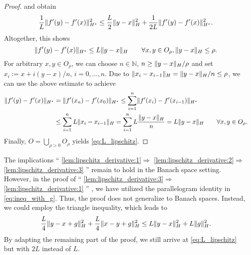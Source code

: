 \documentclass[
	english
]{scrartcl}
\numberwithin{equation}{section} %
\DeclarePairedDelimiter\norm{\lVert}{\rVert}
\newcommand\N{\mathbb{N}}
\newcommand{\dualspace}{^\star}
\begin{document}
\begin{proof}
	and obtain
	\begin{equation*}
		\frac 1 L \norm{f'(y) - f'(x)}^2_{H\dualspace}
		\le
		\frac L2 \norm{y - x}_H^2 + \frac 1 {2 L} \norm{f'(y) - f'(x)}_{H\dualspace}^2
		.
	\end{equation*}
	Altogether,
	this shows
	\begin{equation*}
		\norm{f'(y) - f'(x)}_{H\dualspace}
		\le
		L \norm{y - x}_H
		\qquad
		\forall x,y \in O_\rho, \norm{y - x}_H \le \rho
		.
	\end{equation*}
	For arbitrary $x,y \in O_\rho$,
	we can choose $n \in \N$, $n \ge \norm{y - x}_H / \rho$
	and set
	$x_i := x + i (y - x) / n$, $i = 0,\ldots, n$.
	Due to $\norm{x_i - x_{i-1}}_H = \norm{y - x}_H / n \le \rho$,
	we can use the above estimate to achieve
	\begin{align*}
		\norm{f'(y) - f'(x)}_{H\dualspace}
		&=
		\norm{f'(x_n) - f'(x_0)}_{H\dualspace}
		\le
		\sum_{i = 1}^n \norm{f'(x_i) - f'(x_{i-1})}_{H\dualspace}
		\\
		&\le
		\sum_{i = 1}^n L \norm{x_i - x_{i-1}}_H
		=
		\sum_{i = 1}^n L \frac{\norm{y - x}_H}{n}
		= L \norm{y - x}_H
		\qquad\forall x,y \in O_\rho
		.
	\end{align*}
	Finally,
	$O = \bigcup_{\rho > 0} O_\rho$
	yields
	\eqref{eq:L_lipschitz}.
\end{proof}

The implications
``%
\ref{lem:lipschitz_derivative:1}$\Rightarrow$%
\ref{lem:lipschitz_derivative:2}$\Rightarrow$%
\ref{lem:lipschitz_derivative:3}%
''
remain to hold in the Banach space setting.
However, in the proof of
``%
\ref{lem:lipschitz_derivative:3}$\Rightarrow$%
\ref{lem:lipschitz_derivative:1}%
''%
, we have utilized the parallelogram identity in \eqref{eq:ineq_with_g}.
Thus, the proof does not generalize to Banach spaces.
Instead, we could employ the triangle inequality,
which leads to
\begin{equation*}
	\frac L4 \norm{y - x + g}_H^2 + \frac L4 \norm{x - y + g}_H^2
	\le
	L \norm{y - x}_H^2 + L \norm{g}_H^2
	.
\end{equation*}
By adapting the remaining part of the proof,
we still arrive at \eqref{eq:L_lipschitz}
but with $2 L$ instead of $L$.
\end{document}
